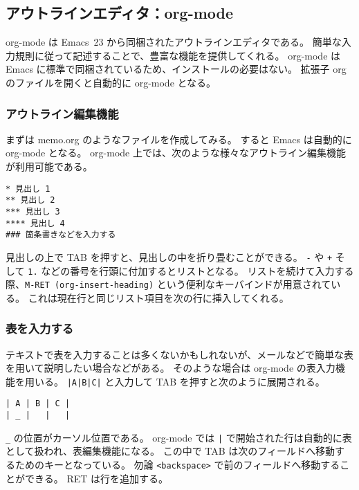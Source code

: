\subsection{アウトラインエディタ：org-mode}
org-mode は Emacs~23 から同梱されたアウトラインエディタである。
簡単な入力規則に従って記述することで、豊富な機能を提供してくれる。
org-mode は Emacs に標準で同梱されているため、インストールの必要はない。
拡張子 org のファイルを開くと自動的に org-mode となる。
\subsubsection{アウトライン編集機能}
まずは memo.org のようなファイルを作成してみる。
すると Emacs は自動的に org-mode となる。
org-mode 上では、次のような様々なアウトライン編集機能が利用可能である。
\begin{mdframed}[roundcorner=0.50zw,leftmargin=3.00zw,rightmargin=3.00zw,skipabove=0.40zw,skipbelow=0.40zw,innertopmargin=4.00pt,innerbottommargin=4.00pt,innerleftmargin=5.00pt,innerrightmargin=5.00pt,linecolor=gray!020,linewidth=0.50pt,backgroundcolor=gray!20]
\begin{verbatim}
* 見出し 1
** 見出し 2
*** 見出し 3
**** 見出し 4
### 箇条書きなどを入力する
\end{verbatim}
\end{mdframed}
見出しの上で TAB を押すと、見出しの中を折り畳むことができる。
\texttt{-} や \texttt{+} そして \texttt{1.} などの番号を行頭に付加するとリストとなる。
リストを続けて入力する際、\texttt{M-RET (org-insert-heading)} という便利なキーバインドが用意されている。
これは現在行と同じリスト項目を次の行に挿入してくれる。
\subsubsection{表を入力する}
テキストで表を入力することは多くないかもしれないが、メールなどで簡単な表を用いて説明したい場合などがある。
そのような場合は org-mode の表入力機能を用いる。
\texttt{|A|B|C|} と入力して TAB を押すと次のように展開される。
\begin{mdframed}[roundcorner=0.50zw,leftmargin=3.00zw,rightmargin=3.00zw,skipabove=0.40zw,skipbelow=0.40zw,innertopmargin=4.00pt,innerbottommargin=4.00pt,innerleftmargin=5.00pt,innerrightmargin=5.00pt,linecolor=gray!020,linewidth=0.50pt,backgroundcolor=gray!20]
\begin{verbatim}
| A | B | C |
| _ |   |   |
\end{verbatim}
\end{mdframed}
\texttt{\_} の位置がカーソル位置である。
org-mode では \texttt{|} で開始された行は自動的に表として扱われ、表編集機能になる。
この中で TAB は次のフィールドへ移動するためのキーとなっている。
勿論 \texttt{<backspace>} で前のフィールドへ移動することができる。
RET は行を追加する。

